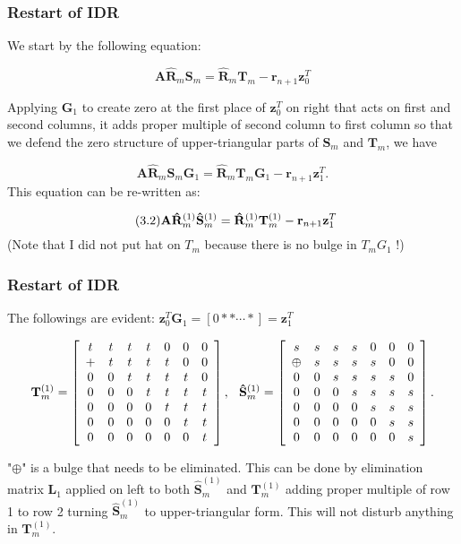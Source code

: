 \documentclass[mathserif]{beamer}
\begin{document}
\begin{frame}
\frametitle{Restart of IDR}
We start by the following equation:

\[\mathbf{A}\mathbf{\hat R}_m\mathbf{S}_m=\mathbf{\hat R}_m \mathbf{T}_m - \mathbf{r}_{n+1}\mathbf{z}_0^T\]

\pause Applying $\mathbf{G}_1$ to create zero at the first place of $\mathbf{z}_0^T$ on right that acts on first and second columns, it adds proper multiple of second column to first column so that we defend the zero structure of upper-triangular parts of $\mathbf{S}_m$ and $\mathbf{T}_m$, we have

\[\mathbf{A}\mathbf{\hat R}_m\mathbf{S}_m\mathbf{G}_1=\mathbf{\hat R}_m \mathbf{T}_m\mathbf{G}_1 - \mathbf{r}_{n+1}\mathbf{z}_1^T.\] This equation can be re-written as:
\pause

\[\tag{3.2}\mathbf{A}\mathbf{\hat R}_m^{(1)}\mathbf{\hat S}_m^{(1)}=\mathbf{\hat R}_m^{(1)} \mathbf{T}_m^{(1)} - \mathbf{r}_{n+1}\mathbf{z}_1^T \hspace{.2in}\] 
(Note that I did not put hat on $T_m$ because there is no bulge in $T_mG_1$ !)\\
\end{frame}

\begin{frame}
\frametitle{Restart of IDR}
The followings are evident: $\mathbf{z}_0^T\mathbf{G}_1=[0 * * \cdots *]=\mathbf{z}_1^T$

\[
\mathbf{T}_m^{(1)}= \left[
\begin{array}{cccccccc}
t & t & t & t  & 0 & 0 & 0 \\
+ & t & t & t  & t & 0 & 0 \\
0 & 0  & t  & t  & t & t & 0 \\
0 & 0  & 0  & t  & t & t & t \\
0 & 0  & 0  & 0  & t & t & t \\
0 & 0  & 0  & 0  & 0 & t & t\\
0 & 0  & 0  & 0  & 0 & 0 & t \\
\end{array}
\right], \hspace{.1in}
\mathbf{\hat S}_m^{(1)}=\left[
\begin{array}{cccccccc}
s & s & s & s  & 0 & 0 & 0 \\
\oplus & s & s & s  & s & 0 & 0 \\
0 & 0  & s & s & s & s & 0 \\
0 & 0  & 0  & s & s & s & s \\
0 & 0  & 0  & 0  & s & s & s \\
0 & 0  & 0  & 0  & 0 & s & s\\
0 & 0  & 0  & 0  & 0 & 0 & s \\
\end{array}
\right].
\]
\pause

"$\oplus$" is a bulge that needs to be eliminated. This can be done by elimination matrix $\mathbf{L}_1$ applied on left to both $\mathbf{\hat S}_m^{(1)}$  and $\mathbf{T}_m^{(1)}$ adding proper multiple of row 1 to row 2 turning $\mathbf{\hat S}_m^{(1)}$ to upper-triangular form. This will not disturb anything in $\mathbf{T}_m^{(1)}$.
\end{frame}
\end{document}
